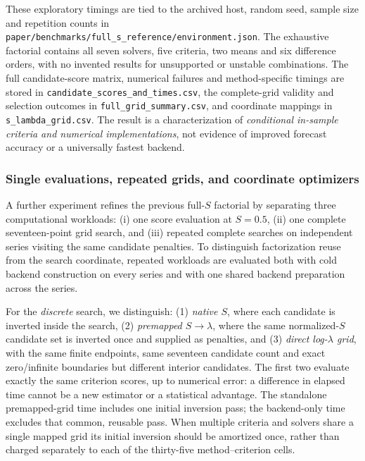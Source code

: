 These exploratory timings are tied to the archived host, random
seed, sample size and repetition counts in
\texttt{paper/benchmarks/full\_s\_reference/environment.json}.
The exhaustive factorial contains all seven solvers, five criteria,
two means and six difference orders, with no invented results for
unsupported or unstable combinations. The full candidate-score matrix,
numerical failures and method-specific timings are stored in
\texttt{candidate\_scores\_and\_times.csv}, the complete-grid
validity and selection outcomes in \texttt{full\_grid\_summary.csv},
and coordinate mappings in \texttt{s\_lambda\_grid.csv}.
The result is a characterization of \emph{conditional in-sample
criteria and numerical implementations}, not evidence of improved
forecast accuracy or a universally fastest backend.

\subsubsection{Single evaluations, repeated grids, and coordinate optimizers}
\label{sec:full-s-search-modes}
A further experiment refines the previous full-$S$ factorial by separating
three computational workloads: (i) one score evaluation at $S=0.5$,
(ii) one complete seventeen-point grid search, and (iii) repeated complete
searches on independent series visiting the same candidate penalties.
To distinguish factorization reuse from the search coordinate, repeated
workloads are evaluated both with cold backend construction on every
series and with one shared backend preparation across the series.

For the \emph{discrete} search, we distinguish:
(1) \emph{native $S$}, where each candidate is inverted inside the
search, (2) \emph{premapped $S\to\lambda$}, where the same normalized-$S$
candidate set is inverted once and supplied as penalties, and
(3) \emph{direct log-$\lambda$ grid}, with the same finite endpoints,
same seventeen candidate count and exact zero/infinite boundaries
but different interior candidates. The first two evaluate exactly
the same criterion scores, up to numerical error: a difference in elapsed
time cannot be a new estimator or a statistical advantage.
The standalone premapped-grid time includes one initial inversion
pass; the backend-only time excludes that common, reusable pass.
When multiple criteria and solvers share a single mapped grid its
initial inversion should be amortized once, rather than charged separately
to each of the thirty-five method--criterion cells.

